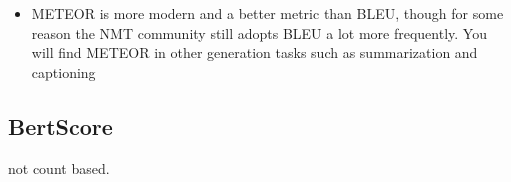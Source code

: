 \documentclass[11pt]{article}
\begin{document}
\begin{minipage}[l]{.5\linewidth}
    \centering
\end{minipage}\hfill
\begin{minipage}[r]{.5\linewidth}
    \begin{itemize}
        \item METEOR is more modern and a better metric than BLEU, though for some reason the NMT community still adopts BLEU a lot more frequently. You will find METEOR in other generation tasks such as summarization and captioning
    \end{itemize}
\end{minipage}

\subsection{BertScore}

not count based.
\end{document}
